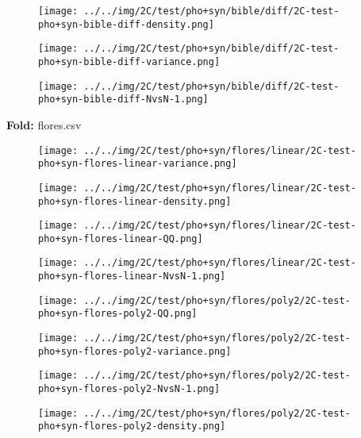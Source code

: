 \begin{figure}[H]
\centering	\texttt{[image: ../../img/2C/test/pho+syn/bible/diff/2C-test-pho+syn-bible-diff-density.png]}
\end{figure}
\begin{figure}[H]
\centering	\texttt{[image: ../../img/2C/test/pho+syn/bible/diff/2C-test-pho+syn-bible-diff-variance.png]}
\end{figure}
\begin{figure}[H]
\centering	\texttt{[image: ../../img/2C/test/pho+syn/bible/diff/2C-test-pho+syn-bible-diff-NvsN-1.png]}
\end{figure}
\textbf{Fold:} flores.csv
\begin{figure}[H]
\centering	\texttt{[image: ../../img/2C/test/pho+syn/flores/linear/2C-test-pho+syn-flores-linear-variance.png]}
\end{figure}
\begin{figure}[H]
\centering	\texttt{[image: ../../img/2C/test/pho+syn/flores/linear/2C-test-pho+syn-flores-linear-density.png]}
\end{figure}
\begin{figure}[H]
\centering	\texttt{[image: ../../img/2C/test/pho+syn/flores/linear/2C-test-pho+syn-flores-linear-QQ.png]}
\end{figure}
\begin{figure}[H]
\centering	\texttt{[image: ../../img/2C/test/pho+syn/flores/linear/2C-test-pho+syn-flores-linear-NvsN-1.png]}
\end{figure}
\begin{figure}[H]
\centering	\texttt{[image: ../../img/2C/test/pho+syn/flores/poly2/2C-test-pho+syn-flores-poly2-QQ.png]}
\end{figure}
\begin{figure}[H]
\centering	\texttt{[image: ../../img/2C/test/pho+syn/flores/poly2/2C-test-pho+syn-flores-poly2-variance.png]}
\end{figure}
\begin{figure}[H]
\centering	\texttt{[image: ../../img/2C/test/pho+syn/flores/poly2/2C-test-pho+syn-flores-poly2-NvsN-1.png]}
\end{figure}
\begin{figure}[H]
\centering	\texttt{[image: ../../img/2C/test/pho+syn/flores/poly2/2C-test-pho+syn-flores-poly2-density.png]}
\end{figure}
